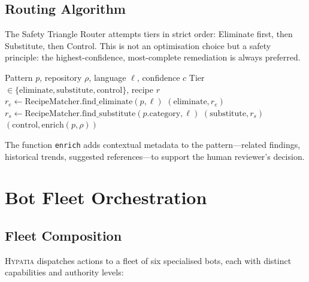 \documentclass[11pt,a4paper]{article}
\begin{document}
\subsection{Routing Algorithm}

The Safety Triangle Router attempts tiers in strict order: Eliminate first, then Substitute, then Control. This is not an optimisation choice but a safety principle: the highest-confidence, most-complete remediation is always preferred.

\begin{algorithm}[htbp]
\caption{Safety Triangle Routing}
\label{alg:triangle}
\begin{algorithmic}[1]
\Require Pattern $p$, repository $\rho$, language $\ell$, confidence $c$
\Ensure Tier $\in \{\text{eliminate}, \text{substitute}, \text{control}\}$, recipe $r$
\State $r_e \gets \text{RecipeMatcher}.\text{find\_eliminate}(p, \ell)$
  \State \Return $(\text{eliminate}, r_e)$
\EndIf
\State $r_s \gets \text{RecipeMatcher}.\text{find\_substitute}(p.\text{category}, \ell)$
  \State \Return $(\text{substitute}, r_s)$
\EndIf
\State \Return $(\text{control}, \text{enrich}(p, \rho))$ 
\end{algorithmic}
\end{algorithm}

The function \texttt{enrich} adds contextual metadata to the pattern---related findings, historical trends, suggested references---to support the human reviewer's decision.


\section{Bot Fleet Orchestration}
\label{sec:fleet}

\subsection{Fleet Composition}

\textsc{Hypatia} dispatches actions to a fleet of six specialised bots, each with distinct capabilities and authority levels:
\end{document}
